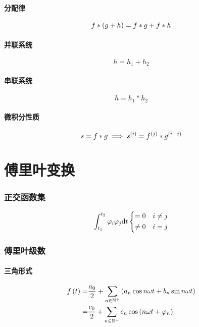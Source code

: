 \documentclass{article}
\begin{document}
\subsection{分配律}

\[f\ast\left(g+h\right)=f\ast g+f\ast h\]

\subsection{并联系统}

\[h=h_1+h_2\]

\subsection{串联系统}

\[h=h_1\ast h_2\]

\subsection{微积分性质}

\[s=f\ast g\implies s^{\left(i\right)}=f^{\left(j\right)}\ast g^{\left(i-j\right)}\]

\part{傅里叶变换}

\section{正交函数集}

\[\int_{t_1}^{t_2}\varphi_i\varphi_j\mathrm d t
    \left\{\begin{aligned}
        =0    &  & i\neq j \\
        \neq0 &  & i=j
    \end{aligned}\right.\]

\section{傅里叶级数}

\subsection{三角形式}

\[\begin{aligned}
        f\left(t\right)
        = & \frac{a_0}2+\sum_{n\in\mathbb N^+}\left(a_n\cos n\omega t+b_n\sin n\omega t\right) \\
        = & \frac{c_0}2+\sum_{n\in\mathbb N^+}c_n\cos\left(n\omega t+\varphi_n\right)
    \end{aligned}\]
\end{document}
